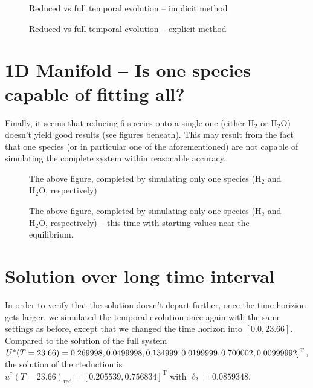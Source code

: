 \documentclass[11pt,a4paper]{article}
\newcommand{\trans}{^{\operatorname{T}}}
\newcommand{\water}{\operatorname{H_2O}}
\newcommand{\hydrogen}{\operatorname{H_2}}
\begin{document}
\begin{figure}
  \caption{Reduced vs full temporal evolution -- implicit method}
\end{figure} 

\begin{figure}
  \caption{Reduced vs full temporal evolution -- explicit method}
\end{figure} 

\section{1D Manifold -- Is one species capable of fitting all?}
Finally, it seems that reducing 6 species onto a single one (either $\hydrogen$ or $\water$) doesn't yield good results (see figures beneath). This may result from the fact that one species (or in particular one of the aforementioned) are not capable of simulating the complete system within reasonable accuracy.

 \begin{figure}
  \caption{The above figure, completed by simulating only one species ($\hydrogen$ and $\water$, respectively)}
\end{figure} 

\begin{figure}
  \caption{The above figure, completed by simulating only one species ($\hydrogen$ and $\water$, respectively) -- this time with starting values near the equilibrium.}
\end{figure} 

\section{Solution over long time interval}
In order to verify that the solution doesn't depart further, once the time horizion gets larger, we simulated the temporal evolution once again with the same settings as before, except that we changed the time horizon into $[0.0, 23.66].$\\
Compared to the solution of the full system\\ $U^*(T=23.66) = 0.269998, 0.0499998, 0.134999, \\ 0.0199999, 0.700002, 0.00999992 ]\trans$, the solution of the rteduction is \\ $u^*(T=23.66)_{\mathrm{red}} = [0.205539, 0.756834]\trans $ with $\ell_2 = 0.0859348.$
\end{document}

